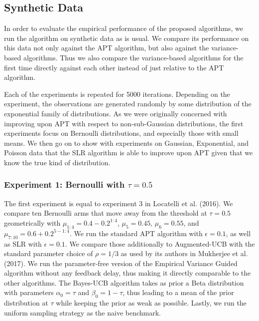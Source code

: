 \documentclass[12pt,]{article}
\begin{document}
\subsection{Synthetic Data}\label{synthetic-data}

In order to evaluate the empirical performance of the proposed
algorithms, we run the algorithm on synthetic data as is usual. We
compare its performance on this data not only against the APT algorithm,
but also against the variance-based algorithms. Thus we also compare the
variance-based algorithms for the first time directly against each other
instead of just relative to the APT algorithm.

Each of the experiments is repeated for 5000 iterations. Depending on
the experiment, the observations are generated randomly by some
distribution of the exponential family of distributions. As we were
originally concerned with improving upon APT with respect to
non-sub-Gaussian distributions, the first experiments focus on Bernoulli
distributions, and especially those with small means. We then go on to
show with experiments on Gaussian, Exponential, and Poisson data that
the SLR algorithm is able to improve upon APT given that we know the
true kind of distribution.

\subsubsection{\texorpdfstring{Experiment 1: Bernoulli with
\(\tau = 0.5\)}{Experiment 1: Bernoulli with \textbackslash{}tau = 0.5}}\label{experiment-1-bernoulli-with-tau-0.5}

The first experiment is equal to experiment 3 in Locatelli et al.
(2016). We compare ten Bernoulli arms that move away from the threshold
at \(\tau = 0.5\) geometrically with \(\mu_{1:4} = 0.4-0.2^{1:4}\),
\(\mu_5 = 0.45\), \(\mu_6 = 0.55\), and
\(\mu_{7:10} = 0.6 + 0.2^{5-1:4}\). We run the standard APT algorithm
with \(\epsilon = 0.1\), as well as SLR with \(\epsilon = 0.1\). We
compare those additionally to Augmented-UCB with the standard parameter
choice of \(\rho = 1/3\) as used by its authors in Mukherjee et al.
(2017). We run the parameter-free version of the Empirical Variance
Guided algorithm without any feedback delay, thus making it directly
comparable to the other algorithms. The Bayes-UCB algorithm takes as
prior a Beta distribution with parameters \(\alpha_0 = \tau\) and
\(\beta_0 = 1 - \tau\), thus leading to a mean of the prior distribution
at \(\tau\) while keeping the prior as weak as possible. Lastly, we run
the uniform sampling strategy as the naive benchmark.
\end{document}
